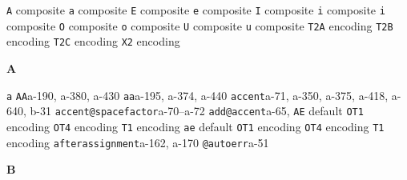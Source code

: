 \documentclass[twoside]{ltxdoc}
\makeatletter
\renewenvironment{theindex}{%
   \@restonecoltrue
   \if@twocolumn\@restonecolfalse\fi
   \columnseprule \z@
   \columnsep 35\p@
   \twocolumn[\index@prologue]%
   \IndexParms
   \let\item\@idxitem
   \ignorespaces
}{\if@restonecol\onecolumn\else\clearpage\fi}
\makeatother
\begin{document}
\begin{theindex}
      \subsubitem \texttt  {A} composite\pfill {}
      \subsubitem \texttt  {a} composite\pfill {}
      \subsubitem \texttt  {E} composite\pfill {}
      \subsubitem \texttt  {e} composite\pfill {}
      \subsubitem \texttt  {I} composite\pfill {}
      \subsubitem \texttt  {i} composite\pfill {}
      \subsubitem \texttt  {i} composite\pfill 
      \subsubitem \texttt  {O} composite\pfill {}
      \subsubitem \texttt  {o} composite\pfill {}
      \subsubitem \texttt  {U} composite\pfill {}
      \subsubitem \texttt  {u} composite\pfill {}
    \subitem \texttt  {T2A} encoding\pfill {}
    \subitem \texttt  {T2B} encoding\pfill {}
    \subitem \texttt  {T2C} encoding\pfill {}
    \subitem \texttt  {X2} encoding\pfill {}

  \indexspace
{\bfseries\hfil A\hfil}\nopagebreak

  \item \texttt  {a}\pfill {}
  \item \texttt  {AA}\pfill a-190, a-380, a-430
  \item \texttt  {aa}\pfill a-195, a-374, a-440
  \item \texttt  {accent}\pfill a-71, a-350, a-375, 
                a-418, a-640, b-31
  \item \texttt  {accent@spacefactor}\pfill a-70--a-72
  \item \texttt  {add@accent}\pfill a-65, 
  \item \texttt  {AE}\efill 
    \subitem default\pfill {}
    \subitem \texttt  {OT1} encoding\pfill {}
    \subitem \texttt  {OT4} encoding\pfill {}
    \subitem \texttt  {T1} encoding\pfill {}
  \item \texttt  {ae}\efill 
    \subitem default\pfill {}
    \subitem \texttt  {OT1} encoding\pfill {}
    \subitem \texttt  {OT4} encoding\pfill {}
    \subitem \texttt  {T1} encoding\pfill {}
  \item \texttt  {afterassignment}\pfill a-162, a-170
  \item \texttt  {@autoerr}\pfill a-51

  \indexspace
{\bfseries\hfil B\hfil}\nopagebreak


\end{theindex}
\end{document}
